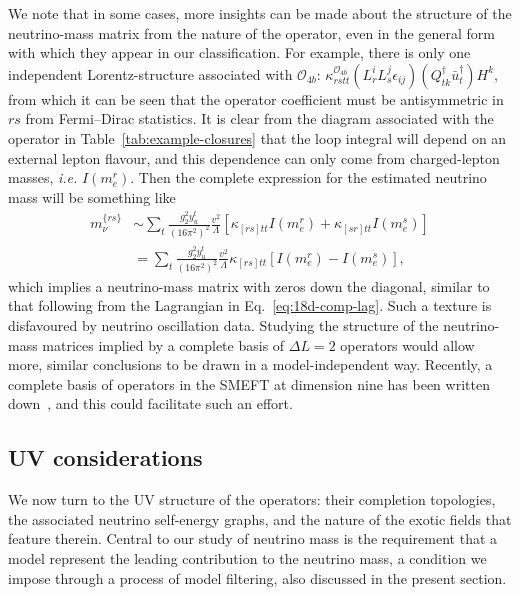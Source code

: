 We note that in some cases, more insights can be made about the structure of the
neutrino-mass matrix from the nature of the operator, even in the general form
with which they appear in our classification. For example, there is only one
independent Lorentz-structure associated with $\mathcal{O}_{4b}$:
$\kappa^{\mathcal{O}_{4b}}_{rstt} (L^{i}_{r} L^{j}_{s} \epsilon_{ij})(Q^{\dagger}_{t k}\bar{u}^{\dagger}_{t})H^{k}$,
from which it can be seen that the operator coefficient must be antisymmetric in
$rs$ from Fermi--Dirac statistics. It is clear from the diagram associated with
the operator in Table~\ref{tab:example-closures} that the loop integral will
depend on an external lepton flavour, and this dependence can only come from
charged-lepton masses, \textit{i.e.} $I(m_{e}^{r})$. Then the complete
expression for the estimated neutrino mass will be something like
\begin{align}
  m_{\nu}^{\{rs\}} &\sim \sum_{t} \frac{g_{2}^{2} y_{u}^{t}}{(16\pi^{2})^{2}} \frac{v^{2}}{\Lambda} [\kappa_{[rs]tt} I(m_{e}^{r}) + \kappa_{[sr]tt} I(m_{e}^{s})] \\
  &= \sum_{t} \frac{g_{2}^{2} y_{u}^{t}}{(16\pi^{2})^{2}} \frac{v^{2}}{\Lambda} \kappa_{[rs]tt}  [I(m_{e}^{r}) - I(m_{e}^{s})],
\end{align}
which implies a neutrino-mass matrix with zeros down the diagonal, similar to
that following from the Lagrangian in Eq.~\eqref{eq:18d-comp-lag}. Such a
texture is disfavoured by neutrino oscillation data. Studying the structure of
the neutrino-mass matrices implied by a complete basis of $\Delta L = 2$
operators would allow more, similar conclusions to be drawn in a
model-independent way. Recently, a complete basis of operators in the SMEFT at
dimension nine has been written down~\cite{Li:2020xlh}, and this could
facilitate such an effort.

\subsection{UV considerations}
\label{sec:uvconsiderations}

We now turn to the UV structure of the operators: their completion topologies,
the associated neutrino self-energy graphs, and the nature of the exotic fields
that feature therein. Central to our study of neutrino mass is the requirement
that a model represent the leading contribution to the neutrino mass, a
condition we impose through a process of model filtering, also discussed in the
present section.

